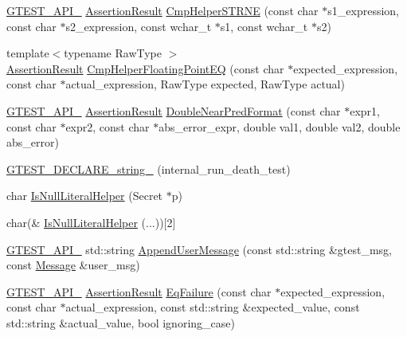 \begin{DoxyCompactItemize}
\item 
\hyperlink{gtest-port_8h_aa73be6f0ba4a7456180a94904ce17790}{G\+T\+E\+S\+T\+\_\+\+A\+P\+I\+\_\+} \hyperlink{classtesting_1_1_assertion_result}{Assertion\+Result} \hyperlink{namespacetesting_1_1internal_a6e700804399b6694d8d6157e3a141b17}{Cmp\+Helper\+S\+T\+R\+N\+E} (const char $\ast$s1\+\_\+expression, const char $\ast$s2\+\_\+expression, const wchar\+\_\+t $\ast$s1, const wchar\+\_\+t $\ast$s2)
\item 
{\footnotesize template$<$typename Raw\+Type $>$ }\\\hyperlink{classtesting_1_1_assertion_result}{Assertion\+Result} \hyperlink{namespacetesting_1_1internal_aaf581f35dfe9f1a3705f99b455a18abd}{Cmp\+Helper\+Floating\+Point\+E\+Q} (const char $\ast$expected\+\_\+expression, const char $\ast$actual\+\_\+expression, Raw\+Type expected, Raw\+Type actual)
\item 
\hyperlink{gtest-port_8h_aa73be6f0ba4a7456180a94904ce17790}{G\+T\+E\+S\+T\+\_\+\+A\+P\+I\+\_\+} \hyperlink{classtesting_1_1_assertion_result}{Assertion\+Result} \hyperlink{namespacetesting_1_1internal_aea60207c4cedc8946a70ada62e38da8f}{Double\+Near\+Pred\+Format} (const char $\ast$expr1, const char $\ast$expr2, const char $\ast$abs\+\_\+error\+\_\+expr, double val1, double val2, double abs\+\_\+error)
\item 
\hyperlink{namespacetesting_1_1internal_ac20f635c3285878fc1195ce687f23950}{G\+T\+E\+S\+T\+\_\+\+D\+E\+C\+L\+A\+R\+E\+\_\+string\+\_\+} (internal\+\_\+run\+\_\+death\+\_\+test)
\item 
char \hyperlink{namespacetesting_1_1internal_afb0731ba39ffef1fa1730ac0699c9025}{Is\+Null\+Literal\+Helper} (Secret $\ast$p)
\item 
char(\& \hyperlink{namespacetesting_1_1internal_ab53ecfa1632a871ce7c692d722a75a57}{Is\+Null\+Literal\+Helper} (...))\mbox{[}2\mbox{]}
\item 
\hyperlink{gtest-port_8h_aa73be6f0ba4a7456180a94904ce17790}{G\+T\+E\+S\+T\+\_\+\+A\+P\+I\+\_\+} std\+::string \hyperlink{namespacetesting_1_1internal_af69e146a989e8d48def39a0cc59461c9}{Append\+User\+Message} (const std\+::string \&gtest\+\_\+msg, const \hyperlink{classtesting_1_1_message}{Message} \&user\+\_\+msg)
\item 
\hyperlink{gtest-port_8h_aa73be6f0ba4a7456180a94904ce17790}{G\+T\+E\+S\+T\+\_\+\+A\+P\+I\+\_\+} \hyperlink{classtesting_1_1_assertion_result}{Assertion\+Result} \hyperlink{namespacetesting_1_1internal_ac61e2ba2cbf259fd6ee5ffd4e49c9445}{Eq\+Failure} (const char $\ast$expected\+\_\+expression, const char $\ast$actual\+\_\+expression, const std\+::string \&expected\+\_\+value, const std\+::string \&actual\+\_\+value, bool ignoring\+\_\+case)

\end{DoxyCompactItemize}
